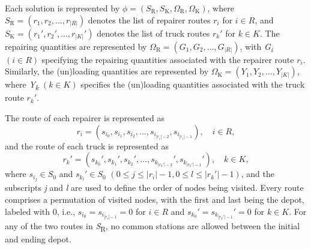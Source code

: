 Each solution is represented by
\(\phi = \left( {S_{\text{R}},S_{\text{K}},\Omega_{\text{R}},\Omega_{\text{K}}} \right)\), where
\(S_{\text{R}} = \left( {r_{1},r_{2},...,r_{|R|}} \right)\) denotes the list of repairer routes
\(r_{i}\) for \(i \in R\), and
\(S_{\text{K}} = \left( {r_{1}',r_{2}',...,r_{|K|}'} \right)\) denotes the list of truck routes
\(r_{k}'\) for \(k \in K\). The repairing quantities are represented by
\(\Omega_{\text{R}} = \left( {G_{1},G_{2},\ldots,G_{|R|}} \right)\), with \emph{G\textsubscript{i}}
\(\left( {i \in R} \right)\) specifying the repairing quantities associated with the repairer route
\(r_{i}\). Similarly, the (un)loading quantities
are represented by \(\Omega_{\text{K}} = \left( {Y_{1},Y_{2},\ldots,Y_{|K|}} \right)\), where
\emph{Y\textsubscript{k}} \(\left( {k \in K} \right)\) specifies the (un)loading quantities
associated with the truck route \(r_{k}'\).

The route of each repairer is represented as
\begin{equation}
r_{i} = \left( s_{i_{0}},s_{i_{1}},s_{i_{2}},\ldots,s_{i_{|r_{i}| - 2}},s_{i_{|r_{i}| - 1}} \right),
\quad i \in R,
\end{equation}
and the route of each truck is represented as
\begin{equation}
r_{k}' = \left( s_{k_{0}}',s_{k_{1}}',s_{k_{2}}',\ldots,
s_{k_{|r_{k}'| - 2}}',s_{k_{|r_{k}'| - 1}}' \right),
\quad k \in K,
\end{equation}
where \(s_{i_{j}} \in S_{0}\) and \(s_{k_{l}}' \in S_{0}\)
\(\left( {0 \leq j \leq \left| r_{i} \right| - 1,0 \leq l \leq \left| r_{k}' \right| - 1} \right)\),
and the subscripts \emph{j} and \emph{l} are used to define the order of nodes being visited. Every
route comprises a permutation of visited nodes, with the first and last being the depot, labeled
with 0, i.e.,
\(s_{i_{0}} = s_{i_{|r_{i}| - 1}} = 0\) for \(i \in R\)
and
\(s_{k_{0}}' = s_{k_{|r_{k}'| - 1}}' = 0\) for \(k \in K\).
For any of the two routes in \emph{S}\textsubscript{R}, no common stations are allowed between the
initial and ending depot.

